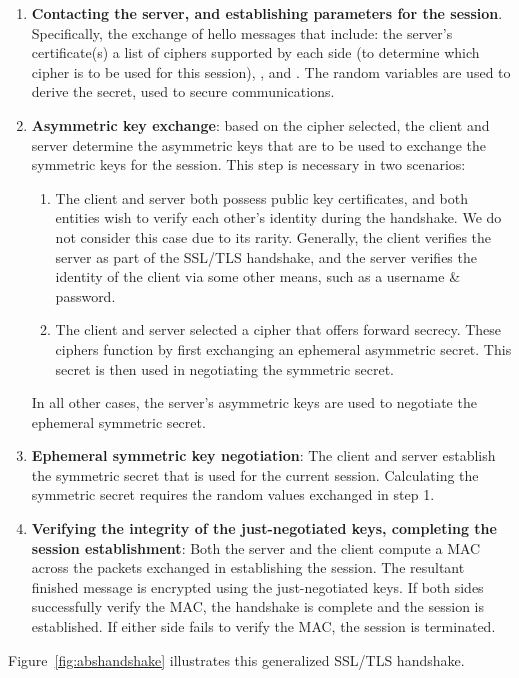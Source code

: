 \documentclass[../main.tex]{subfiles}
\begin{document}
\begin{enumerate}
  \item \textbf{Contacting the server, and establishing parameters for
    the session}. Specifically, the exchange of hello messages that
    include: the server's certificate(s) a list of ciphers supported by
    each side (to determine which cipher is to be used for this session),
    \srandom, and \crandom. The random variables are used to derive the
    secret, used to secure communications.
  \item \textbf{Asymmetric key exchange}: based on the cipher
    selected, the client and server determine the asymmetric keys that are
    to be used to exchange the symmetric keys for the session. This step
    is necessary in two scenarios:
    \begin{enumerate}
      \item The client and server both possess public key
        certificates, and both entities wish to verify each other's identity
        during the handshake. We do not consider this case due to its
        rarity. Generally, the client verifies the server as part of the
        SSL/TLS handshake, and the server verifies the identity of the client
        via some other means, such as a username \& password.
      \item The client and server selected a cipher that offers
        forward secrecy. These ciphers function by first exchanging an
        ephemeral asymmetric secret. This secret is then used in negotiating
        the symmetric secret.
    \end{enumerate} In all other cases, the server's asymmetric keys
    are used to negotiate the ephemeral symmetric secret.
  \item \textbf{Ephemeral symmetric key negotiation}: The client and
    server establish the symmetric secret that is used for the current
    session. Calculating the symmetric secret requires the random values
    exchanged in step 1.
  \item \textbf{Verifying the integrity of the just-negotiated keys,
    completing the session establishment}: Both the server and the client
    compute a MAC across the packets exchanged in establishing the
    session. The resultant finished message is encrypted using the
    just-negotiated keys. If both sides successfully verify the MAC, the
    handshake is complete and the session is established. If either side
    fails to verify the MAC, the session is terminated.
\end{enumerate} Figure~\ref{fig:abshandshake} illustrates this
generalized SSL/TLS handshake.
\end{document}
